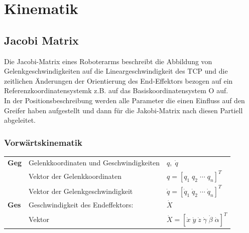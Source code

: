 
\section{Kinematik}
\subsection{Jacobi Matrix}

Die Jacobi-Matrix eines Roboterarms beschreibt die Abbildung von
Gelenkgeschwindigkeiten auf die Lineargeschwindigkeit des TCP
und die zeitlichen Änderungen der Orientierung des End-Effektors
bezogen auf ein Referenzkoordinatensystemk z.B. auf das
Basiskoordinatensystem O auf. \\
In der Positionsbeschreibung werden alle Parameter die einen Einfluss 
auf den Greifer haben aufgestellt und dann für die Jakobi-Matrix nach diesen Partiell abgeleitet.

\subsubsection{Vorwärtskinematik}
\begin{tabular}{lll}
    \textbf{Geg}&Gelenkkoordinaten und Geschwindigkeiten&$q,\; \dot{q}$\\
    &Vektor der Gelenkkoordinaten&$ q = \left[ q_1\; q_2 \;  \cdots \;  q_n\right]^T$\\
    &Vektor der Gelenkgeschwindigkeit&$ \dot{q} = \left[\dot{q}_1\; \dot{q}_2\; \cdots\;  \dot{q}_n \right]^T$\\
    \textbf{Ges}&Geschwindigkeit des Endeffektors:&$\dot{X}$\\
    &Vektor&$\dot{X} = [\dot{x}\; \dot{y}\; \dot{z}\;
    \dot{\gamma}\; \dot{\beta}\; \dot{\alpha}]^{T}$\\
\end{tabular}

